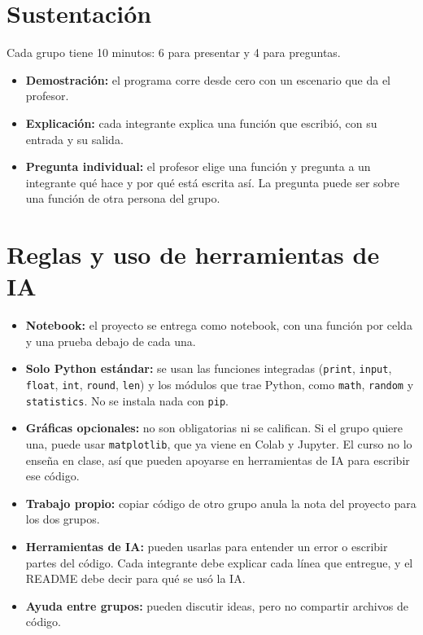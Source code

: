 \documentclass[doc]{apa6}
\begin{document}
\section*{Sustentación}
Cada grupo tiene 10 minutos: 6 para presentar y 4 para preguntas.
\begin{itemize}
    \item \textbf{Demostración:} el programa corre desde cero con un escenario que da el profesor.
    \item \textbf{Explicación:} cada integrante explica una función que escribió, con su entrada y su salida.
    \item \textbf{Pregunta individual:} el profesor elige una función y pregunta a un integrante qué hace y por qué está escrita así. La pregunta puede ser sobre una función de otra persona del grupo.
\end{itemize}

\section*{Reglas y uso de herramientas de IA}
\begin{itemize}
    \item \textbf{Notebook:} el proyecto se entrega como notebook, con una función por celda y una prueba debajo de cada una.
    \item \textbf{Solo Python estándar:} se usan las funciones integradas (\texttt{print}, \texttt{input}, \texttt{float}, \texttt{int}, \texttt{round}, \texttt{len}) y los módulos que trae Python, como \texttt{math}, \texttt{random} y \texttt{statistics}. No se instala nada con \texttt{pip}.
    \item \textbf{Gráficas opcionales:} no son obligatorias ni se califican. Si el grupo quiere una, puede usar \texttt{matplotlib}, que ya viene en Colab y Jupyter. El curso no lo enseña en clase, así que pueden apoyarse en herramientas de IA para escribir ese código.
    \item \textbf{Trabajo propio:} copiar código de otro grupo anula la nota del proyecto para los dos grupos.
    \item \textbf{Herramientas de IA:} pueden usarlas para entender un error o escribir partes del código. Cada integrante debe explicar cada línea que entregue, y el README debe decir para qué se usó la IA.
    \item \textbf{Ayuda entre grupos:} pueden discutir ideas, pero no compartir archivos de código.
\end{itemize}
\newpage
\end{document}
